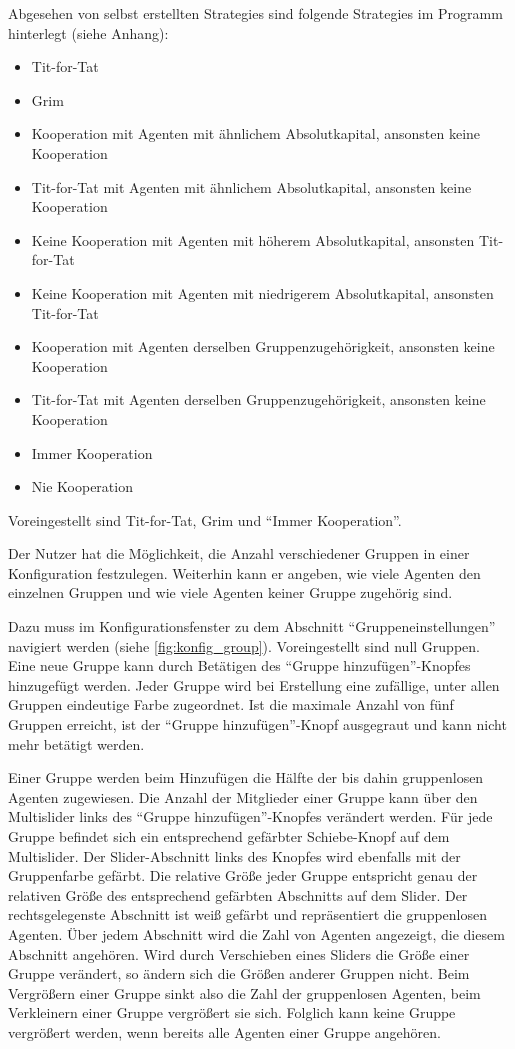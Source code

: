 \documentclass[parskip=full,11pt]{scrartcl}
\begin{document}
Abgesehen von selbst erstellten \Glspl{Strategie} sind folgende \Glspl{Strategie} im Programm hinterlegt (siehe Anhang):
\begin{itemize} \itemsep -10pt
\item Tit-for-Tat
\item Grim
\item Kooperation mit Agenten mit ähnlichem Absolutkapital, ansonsten keine Kooperation
\item Tit-for-Tat mit Agenten mit ähnlichem Absolutkapital, ansonsten keine Kooperation
\item Keine Kooperation mit Agenten mit höherem Absolutkapital, ansonsten Tit-for-Tat
\item Keine Kooperation mit Agenten mit niedrigerem Absolutkapital, ansonsten Tit-for-Tat
\item Kooperation mit Agenten derselben Gruppenzugehörigkeit, ansonsten keine Kooperation
\item Tit-for-Tat mit Agenten derselben Gruppenzugehörigkeit, ansonsten keine Kooperation
\item Immer Kooperation
\item Nie Kooperation
\end{itemize}
Voreingestellt sind Tit-for-Tat, Grim und \enquote{Immer Kooperation}.

Der \Gls{Nutzer} hat die Möglichkeit, die Anzahl verschiedener Gruppen in einer Konfiguration festzulegen. Weiterhin kann er angeben, wie viele Agenten den einzelnen Gruppen und wie viele Agenten keiner Gruppe zugehörig sind.

Dazu muss im Konfigurationsfenster zu dem Abschnitt \enquote{Gruppeneinstellungen} navigiert werden (siehe \cref{fig:konfig_group}). Voreingestellt sind null Gruppen. Eine neue Gruppe kann durch Betätigen des \enquote{Gruppe hinzufügen}-Knopfes hinzugefügt werden. Jeder Gruppe wird bei Erstellung eine zufällige, unter allen Gruppen eindeutige Farbe zugeordnet. Ist die maximale Anzahl von fünf Gruppen erreicht, ist der \enquote{Gruppe hinzufügen}-Knopf ausgegraut und kann nicht mehr betätigt werden.

Einer Gruppe werden beim Hinzufügen die Hälfte der bis dahin gruppenlosen Agenten zugewiesen. Die Anzahl der Mitglieder einer Gruppe kann über den \Gls{Multislider} links des \enquote{Gruppe hinzufügen}-Knopfes verändert werden. Für jede Gruppe befindet sich ein entsprechend gefärbter Schiebe-Knopf auf dem \Gls{Multislider}. Der \Gls{Slider-Abschnitt} links des Knopfes wird ebenfalls mit der Gruppenfarbe gefärbt. Die relative Größe jeder Gruppe entspricht genau der relativen Größe des entsprechend gefärbten Abschnitts auf dem Slider. Der rechtsgelegenste Abschnitt ist weiß gefärbt und repräsentiert die gruppenlosen Agenten. Über jedem Abschnitt wird die Zahl von Agenten angezeigt, die diesem Abschnitt angehören. Wird durch Verschieben eines Sliders die Größe einer Gruppe verändert, so ändern sich die Größen anderer Gruppen nicht. Beim Vergrößern einer Gruppe sinkt also die Zahl der gruppenlosen Agenten, beim Verkleinern einer Gruppe vergrößert sie sich. Folglich kann keine Gruppe vergrößert werden, wenn bereits alle Agenten einer Gruppe angehören.
\end{document}
